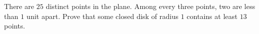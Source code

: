 There are $25$ distinct points in the plane. Among every three points, two are less than $1$ unit apart. Prove that some closed disk of radius $1$ contains at least $13$ points.
